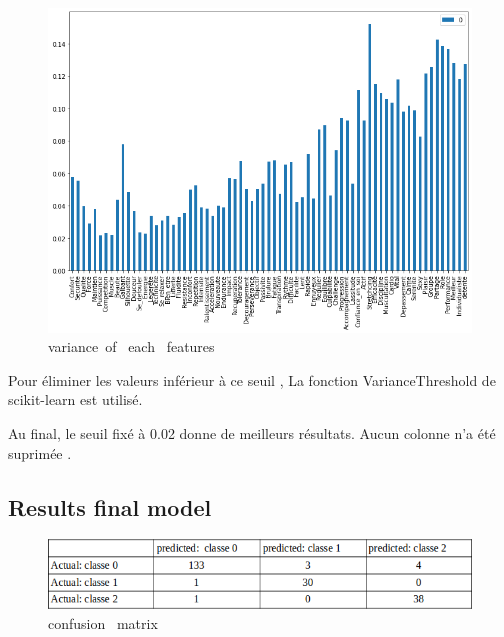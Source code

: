 \documentclass[12pt]{article}
\begin{document}
\begin{figure}[H]
\begin{center}
\includegraphics[scale=0.6]{barlot.png}
\caption[]{ variance\ of \ each \ features}
\end{center}
\end{figure}

Pour éliminer les valeurs inférieur à ce seuil , La fonction VarianceThreshold de scikit-learn est utilisé.

Au final, le seuil fixé à 0.02 donne de meilleurs résultats. Aucun  colonne n'a été suprimée . 

\subsection{Results final model} 

\begin{figure}[H]
\begin{center}
\includegraphics[scale=0.6]{confusion_matrix_1.png} 
\caption[]{  confusion \ matrix }
\end{center}
\end{figure}
\end{document}
